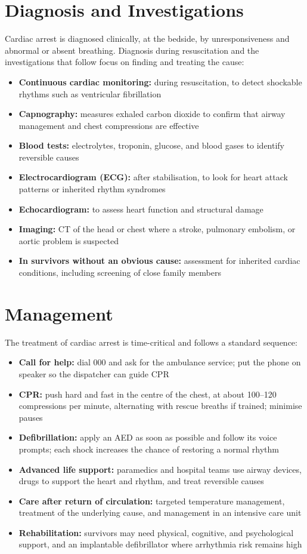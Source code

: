 \section*{Diagnosis and Investigations}
Cardiac arrest is diagnosed clinically, at the bedside, by unresponsiveness and abnormal or absent breathing. Diagnosis during resuscitation and the investigations that follow focus on finding and treating the cause:
\begin{itemize}
    \item \textbf{Continuous cardiac monitoring:} during resuscitation, to detect shockable rhythms such as ventricular fibrillation
    \item \textbf{Capnography:} measures exhaled carbon dioxide to confirm that airway management and chest compressions are effective
    \item \textbf{Blood tests:} electrolytes, troponin, glucose, and blood gases to identify reversible causes
    \item \textbf{Electrocardiogram (ECG):} after stabilisation, to look for heart attack patterns or inherited rhythm syndromes
    \item \textbf{Echocardiogram:} to assess heart function and structural damage
    \item \textbf{Imaging:} CT of the head or chest where a stroke, pulmonary embolism, or aortic problem is suspected
    \item \textbf{In survivors without an obvious cause:} assessment for inherited cardiac conditions, including screening of close family members
\end{itemize}

\section*{Management}
The treatment of cardiac arrest is time-critical and follows a standard sequence:
\begin{itemize}
    \item \textbf{Call for help:} dial 000 and ask for the ambulance service; put the phone on speaker so the dispatcher can guide CPR
    \item \textbf{CPR:} push hard and fast in the centre of the chest, at about 100--120 compressions per minute, alternating with rescue breaths if trained; minimise pauses
    \item \textbf{Defibrillation:} apply an AED as soon as possible and follow its voice prompts; each shock increases the chance of restoring a normal rhythm
    \item \textbf{Advanced life support:} paramedics and hospital teams use airway devices, drugs to support the heart and rhythm, and treat reversible causes
    \item \textbf{Care after return of circulation:} targeted temperature management, treatment of the underlying cause, and management in an intensive care unit
    \item \textbf{Rehabilitation:} survivors may need physical, cognitive, and psychological support, and an implantable defibrillator where arrhythmia risk remains high
\end{itemize}

